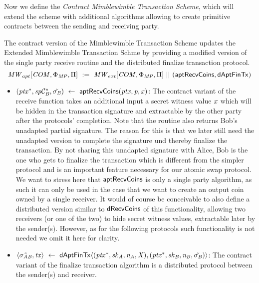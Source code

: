 Now we define the \emph{Contract Mimblewimble Transaction Scheme}, which will extend the scheme with additional algorithms allowing to create primitive contracts between the sending and receiving party.

\begin{definition}
    \label{def:atom:apt-ext-mw-tx-scheme}
    The contract version of the Mimblewimble Transaction Scheme updates the Extended Mimblewimble Transaction Schme by providing a modified version of the single party receive routine and the distributed finalize transaction protocol.
    \[ \mathit{MW}_{apt}[\mathit{COM},\Phi_{\mathit{MP}},\Pi] ~:=~ \mathit{MW}_{ext}[\mathit{COM},\Phi_{\mathit{MP}},\Pi] ~||~ (\mathsf{aptRecvCoins}, \mathsf{dAptFinTx}) \]
    \begin{itemize}
        \item $(\mathit{ptx}^*, \mathit{sp}\mathcal{C}_{\mathit{B}}^*, \tilde{\sigma_{\mathit{B}}}) ~\leftarrow~ \mathsf{aptRecvCoins}(\mathit{ptx},\mathit{p},\mathit{x})$: The contract variant of the receive function takes an additional input a secret witness value
        $\mathit{x}$ which will be hidden in the transaction signature and extractable by the other party after the protocols' completion.
        Note that the routine also returns Bob's unadapted partial signature.
        The reason for this is that we later still need the unadapted version to complete the signature und thereby finalize the transaction.
        By not sharing this unadapted signature with Alice, Bob is the one who gets to finalize the transaction which is different from the simpler protocol and is an important feature necessary for our atomic swap protocol.
        We want to stress here that $\mathsf{aptRecvCoins}$ is only a single party algorithm, as such it can only be used in the case that we want to create an output coin owned by a single receiver.
        It would of course be conceivable to also define a distributed version similar to $\mathsf{dRecvCoins}$ of this functionality, allowing two receivers (or one of the two) to hide secret witness values, extractable later by the sender(s).
        However, as for the following protocols such functionality is not needed we omit it here for clarity.
        \item $\langle \tilde{\sigma_{\mathit{A}\mathit{B}}}, \mathit{tx} \rangle ~\leftarrow~ \mathsf{dAptFinTx} \langle (\mathit{ptx}^*,\mathit{sk}_{\mathit{A}},\mathit{\mathit{n}_{\mathit{A}}},\mathit{X}), (\mathit{ptx}^*,\mathit{sk}_{\mathit{B}},\mathit{\mathit{n}_{\mathit{B}}},\tilde{\sigma_{\mathit{B}}}) \rangle$: The contract variant of the finalize transaction algorithm is a distributed protocol between the sender(s) and receiver.

\end{itemize}
\end{definition}
